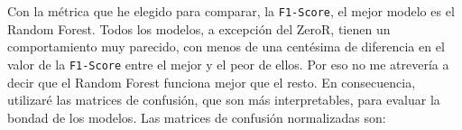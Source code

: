 \documentclass[a4]{article}
\begin{document}
Con la métrica que he elegido para comparar, la \texttt{F1-Score}, el mejor modelo es el Random Forest. Todos los modelos, a excepción del ZeroR, tienen un comportamiento muy parecido, con menos de una centésima de diferencia en el valor de la \texttt{F1-Score} entre el mejor y el peor de ellos. Por eso no me atrevería a decir que el Random Forest funciona mejor que el resto. En consecuencia, utilizaré las matrices de confusión, que son más interpretables, para evaluar la bondad de los modelos. Las matrices de confusión normalizadas son:

\begin{figure}[H]
  \centering
\end{figure}
\end{document}
